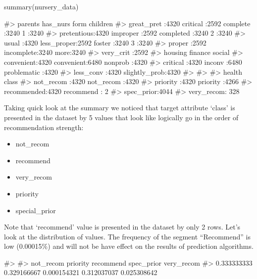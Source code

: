 \begin{Schunk}
\begin{Sinput}
summary(nursery_data)
\end{Sinput}
\begin{Soutput}
#>         parents            has_nurs            form      children   
#>  great_pret :4320   critical   :2592   complete  :3240   1   :3240  
#>  pretentious:4320   improper   :2592   completed :3240   2   :3240  
#>  usual      :4320   less_proper:2592   foster    :3240   3   :3240  
#>                     proper     :2592   incomplete:3240   more:3240  
#>                     very_crit  :2592                                
#>        housing           finance               social    
#>  convenient:4320   convenient:6480   nonprob      :4320  
#>  critical  :4320   inconv    :6480   problematic  :4320  
#>  less_conv :4320                     slightly_prob:4320  
#>                                                          
#>                                                          
#>          health            class     
#>  not_recom  :4320   not_recom :4320  
#>  priority   :4320   priority  :4266  
#>  recommended:4320   recommend :   2  
#>                     spec_prior:4044  
#>                     very_recom: 328
\end{Soutput}
\end{Schunk}

Taking quick look at the summary we noticed that target attribute
`class' is presented in the dataset by 5 values that look like logically
go in the order of recommendation strength:

\begin{itemize}
\tightlist
\item
  not\_recom
\item
  recommend
\item
  very\_recom
\item
  priority
\item
  special\_prior
\end{itemize}

Note that `recommend' value is presented in the dataset by only 2 rows.
Let's look at the distribution of values. The frequency of the segment
``Recommend'' is low (0.00015\%) and will not be have effect on the
results of prediction algorithms.

\begin{Schunk}
\begin{Soutput}
#> 
#>   not_recom    priority   recommend  spec_prior  very_recom 
#> 0.333333333 0.329166667 0.000154321 0.312037037 0.025308642
\end{Soutput}
\end{Schunk}

